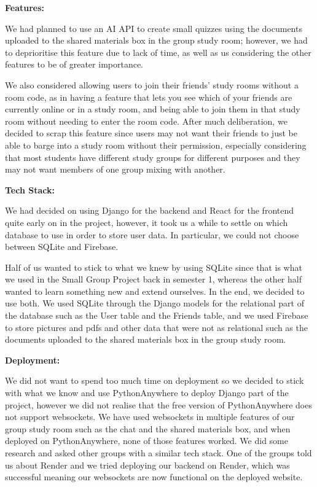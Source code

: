\textbf{Features:}

We had planned to use an AI API to create small quizzes using the documents uploaded to the shared materials box in the group study room; however, we had to deprioritise this feature due to lack of time, as well as us considering the other features to be of greater importance.

We also considered allowing users to join their friends' study rooms without a room code, as in having a feature that lets you see which of your friends are currently online or in a study room, and being able to join them in that study room without needing to enter the room code. After much deliberation, we decided to scrap this feature since users may not want their friends to just be able to barge into a study room without their permission, especially considering that most students have different study groups for different purposes and they may not want members of one group mixing with another.


\textbf{Tech Stack:}

We had decided on using Django for the backend and React for the frontend quite early on in the project, however, it took us a while to settle on which database to use in order to store user data. In particular, we could not choose between SQLite and Firebase. 

Half of us wanted to stick to what we knew by using SQLite since that is what we used in the Small Group Project back in semester 1, whereas the other half wanted to learn something new and extend ourselves. In the end, we decided to use both. We used SQLite through the Django models for the relational part of the database such as the User table and the Friends table, and we used Firebase to store pictures and pdfs and other data that were not as relational such as the documents uploaded to the shared materials box in the group study room.

\textbf{Deployment:}

We did not want to spend too much time on deployment so we decided to stick with what we know and use PythonAnywhere to deploy Django part of the project, however we did not realise that the free version of PythonAnywhere does not support websockets. We have used websockets in multiple features of our group study room such as the chat and the shared materials box, and when deployed on PythonAnywhere, none of those features worked. We did some research and asked other groups with a similar tech stack. One of the groups told us about Render and we tried deploying our backend on Render, which was successful meaning our websockets are now functional on the deployed website.

